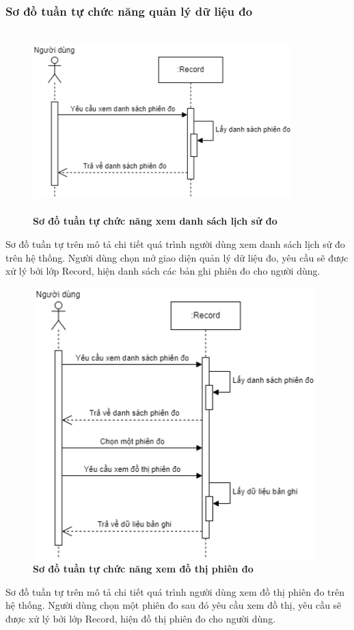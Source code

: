 \subsubsection{Sơ đồ tuần tự chức năng quản lý dữ liệu đo}
\begin{figure}[H]
  \centering
  \includegraphics[width=10cm,height=7cm]{Images/sequence/sequence_manage_record.png}
  \caption[Sơ đồ tuần tự chức năng xem danh sách lịch sử đo]{\bfseries \fontsize{12pt}{0pt}
  \selectfont Sơ đồ tuần tự chức năng xem danh sách lịch sử đo}
  \label{sequence_manage_record} %
\end{figure}
Sơ đồ tuần tự trên mô tả chi tiết quá trình người dùng xem danh sách lịch sử đo trên hệ thống. Người dùng chọn mở giao diện quản lý dữ liệu đo, 
yêu cầu sẽ được xử lý bởi lớp Record, hiện danh sách các bản ghi phiên đo cho người dùng.

\begin{figure}[H]
  \centering
  \includegraphics[width=11cm,height=10.5cm]{Images/sequence/sequence_manage_chart_record.png}
  \caption[Sơ đồ tuần tự chức năng xem đồ thị phiên đo]{\bfseries \fontsize{12pt}{0pt}
  \selectfont Sơ đồ tuần tự chức năng xem đồ thị phiên đo}
  \label{sequence_manage_chart_record} %
\end{figure}
Sơ đồ tuần tự trên mô tả chi tiết quá trình người dùng xem đồ thị phiên đo trên hệ thống. Người dùng chọn một phiên đo sau đó yêu cầu xem đồ thị, 
yêu cầu sẽ được xử lý bởi lớp Record, hiện đồ thị phiên đo cho người dùng.

